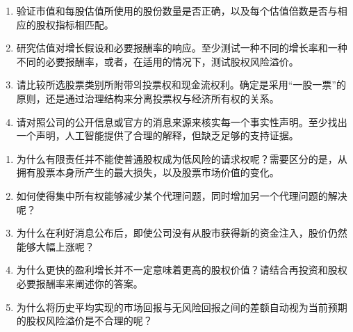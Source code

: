 \begin{enumerate}

\item 验证市值和每股估值所使用的股份数量是否正确，以及每个估值倍数是否与相应的股权指标相匹配。

\item 研究估值对增长假设和必要报酬率的响应。至少测试一种不同的增长率和一种不同的必要报酬率，或者，在适用的情况下，测试股权风险溢价。

\item 请比较所选股票类别所附带의投票权和现金流权利。确定是采用“一股一票”的原则，还是通过治理结构来分离投票权与经济所有权的关系。

\item 请对照公司的公开信息或官方的消息来源来核实每一个事实性声明。至少找出一个声明，人工智能提供了合理的解释，但缺乏足够的支持证据。

\end{enumerate}



\begin{enumerate}

\item 为什么有限责任并不能使普通股权成为低风险的请求权呢？需要区分的是，从拥有股票本身所产生的最大损失，以及股票市场价值的变化。

\item 如何使得集中所有权能够减少某个代理问题，同时增加另一个代理问题的解决呢？

\item 为什么在利好消息公布后，即使公司没有从股市获得新的资金注入，股价仍然能够大幅上涨呢？

\item 为什么更快的盈利增长并不一定意味着更高的股权价值？请结合再投资和股权必要报酬率来阐述你的答案。

\item 为什么将历史平均实现的市场回报与无风险回报之间的差额自动视为当前预期的股权风险溢价是不合理的呢？

\end{enumerate}



